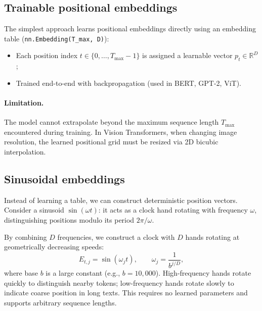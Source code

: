 \documentclass[11pt,a4paper]{article}
\newcommand{\R}{\mathbb{R}}
\newcommand{\slides}[1]{\par\nopagebreak\noindent{\normalfont\small\emph{(slides #1)}}\par\nopagebreak\vspace{2pt}}
\theoremstyle{definition}
\theoremstyle{plain}
\begin{document}
\subsection{Trainable positional embeddings}\slides{48 / 84}
The simplest approach learns positional embeddings directly using an embedding table (\texttt{nn.Embedding(T\_max, D)}):
\begin{itemize}[nosep]
\item Each position index $t \in \{0, \dots, T_{\max}-1\}$ is assigned a learnable vector $p_t \in \R^D$;
\item Trained end-to-end with backpropagation (used in BERT, GPT-2, ViT).
\end{itemize}
\paragraph{Limitation.} The model cannot extrapolate beyond the maximum sequence length $T_{\max}$ encountered during training. In Vision Transformers, when changing image resolution, the learned positional grid must be resized via 2D bicubic interpolation.

\subsection{Sinusoidal embeddings}\slides{49 / 84}
Instead of learning a table, we can construct deterministic position vectors. Consider a sinusoid $\sin(\omega t)$: it acts as a clock hand rotating with frequency $\omega$, distinguishing positions modulo its period $2\pi/\omega$.

By combining $D$ frequencies, we construct a clock with $D$ hands rotating at geometrically decreasing speeds:
\begin{equation}
E_{t, j} = \sin(\omega_j t), \qquad \omega_j = \frac{1}{b^{j/D}},
\end{equation}
where base $b$ is a large constant (e.g., $b = 10{,}000$). High-frequency hands rotate quickly to distinguish nearby tokens; low-frequency hands rotate slowly to indicate coarse position in long texts. This requires no learned parameters and supports arbitrary sequence lengths.
\end{document}
